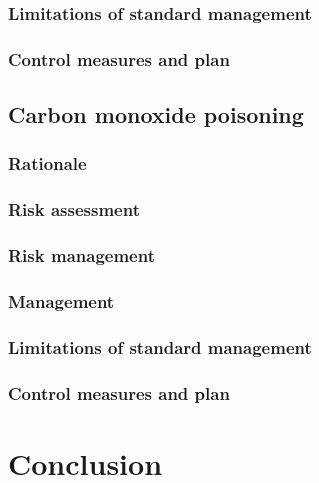 \documentclass[12pt,a4paper]{article}
\begin{document}
\subsubsection{Limitations of standard management}

\subsubsection{Control measures and plan}

\subsection{Carbon monoxide poisoning}

\subsubsection{Rationale}

\subsubsection{Risk assessment}

\subsubsection{Risk management}

\subsubsection{Management}

\subsubsection{Limitations of standard management}

\subsubsection{Control measures and plan}

\section{Conclusion}





\end{document}
